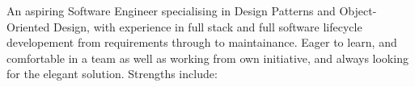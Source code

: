 An aspiring Software Engineer specialising in Design Patterns and Object-Oriented Design, with experience in 
full stack and full software lifecycle developement from requirements through to maintainance. Eager to learn, 
and comfortable in a team as well as working from own initiative, and always looking for the elegant solution.
Strengths include: \newline{} \newline{}

